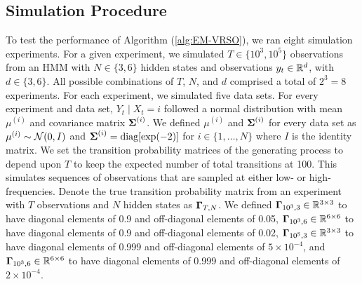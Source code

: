 
\subsection{Simulation Procedure}

To test the performance of Algorithm (\ref{alg:EM-VRSO}), we ran eight simulation experiments. For a given experiment, we simulated $T \in \{10^3,10^5\}$ observations from an HMM with $N \in \{3,6\}$ hidden states and observations $y_t \in \mathbb{R}^d$, with $d \in \{3,6\}$. All possible combinations of $T$, $N$, and $d$ comprised a total of $2^3 = 8$ experiments. For each experiment, we simulated five data sets. For every experiment and data set, $Y_t \mid X_t = i$ followed a normal distribution with mean $\mu^{(i)}$ and covariance matrix $\boldsymbol{\Sigma}^{(i)}$. We defined $\mu^{(i)}$ and $\boldsymbol{\Sigma}^{(i)}$ for every data set as
%
$\mu^{(i)} \sim \mathcal{N}(0,I)$ and $\boldsymbol{\Sigma}^{(i)} = \text{diag}[\exp(-2)]$ for $i \in \{1,\ldots,N\}$
%
where $I$ is the identity matrix.
%
We set the transition probability matrices of the generating process to depend upon $T$ to keep the expected number of total transitions at 100. This simulates sequences of observations that are sampled at either low- or high- frequencies.
%
Denote the true transition probability matrix from an experiment with $T$ observations and $N$ hidden states as $\boldsymbol{\Gamma}_{T,N}$. We defined $\boldsymbol{\Gamma}_{10^3,3} \in \mathbb{R}^{3 \times 3}$ to have diagonal elements of 0.9 and off-diagonal elements of 0.05, $\boldsymbol{\Gamma}_{10^3,6} \in \mathbb{R}^{6 \times 6}$ to have diagonal elements of 0.9 and off-diagonal elements of 0.02, $\boldsymbol{\Gamma}_{10^5,3} \in \mathbb{R}^{3 \times 3}$ to have diagonal elements of 0.999 and off-diagonal elements of $5 \times 10^{-4}$, and $\boldsymbol{\Gamma}_{10^3,6} \in \mathbb{R}^{6 \times 6}$ to have diagonal elements of 0.999 and off-diagonal elements of $2 \times 10^{-4}$. 
%
\iffalse
